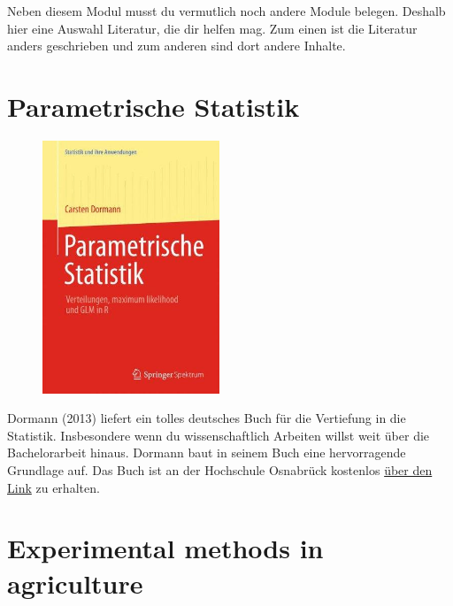 \documentclass[
  letterpaper,
]{scrbook}
\begin{document}
Neben diesem Modul musst du vermutlich noch andere Module belegen.
Deshalb hier eine Auswahl Literatur, die dir helfen mag. Zum einen ist
die Literatur anders geschrieben und zum anderen sind dort andere
Inhalte.

\hypertarget{parametrische-statistik}{%
\section{Parametrische Statistik}\label{parametrische-statistik}}

\begin{figure}

{\centering \includegraphics[width=2.08333in,height=\textheight]{./images/dormann.jpg}

}

\end{figure}

Dormann (2013) liefert ein tolles deutsches Buch für die Vertiefung in
die Statistik. Insbesondere wenn du wissenschaftlich Arbeiten willst
weit über die Bachelorarbeit hinaus. Dormann baut in seinem Buch eine
hervorragende Grundlage auf. Das Buch ist an der Hochschule Osnabrück
kostenlos
\href{https://link.springer.com/book/10.1007/978-3-662-54684-0}{über den
Link} zu erhalten.

\hypertarget{experimental-methods-in-agriculture}{%
\section{Experimental methods in
agriculture}\label{experimental-methods-in-agriculture}}
\end{document}
